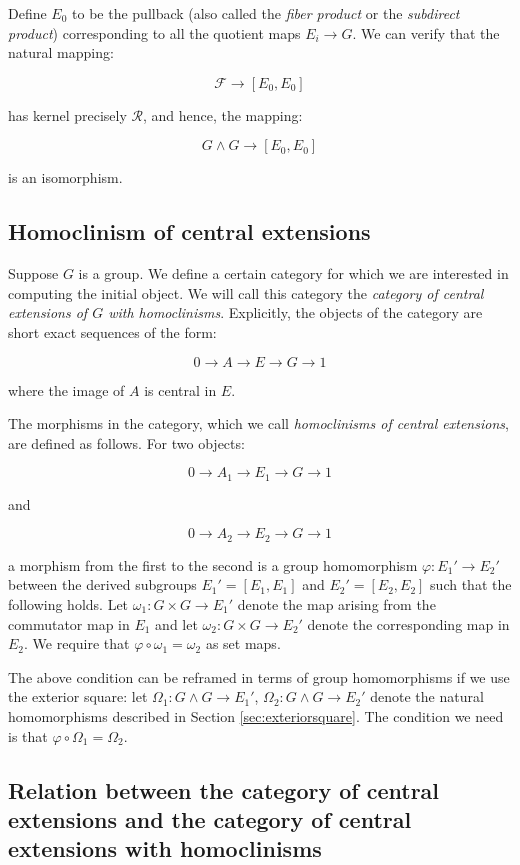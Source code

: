 Define $E_0$ to be the pullback (also called the {\em fiber product}
or the {\em subdirect product}) corresponding to all the quotient maps
$E_i \to G$. We can verify that the natural mapping:

$$\mathcal{F} \to [E_0,E_0]$$

has kernel precisely $\mathcal{R}$, and hence, the mapping:

$$G \wedge G \to [E_0,E_0]$$

is an isomorphism.

\subsection{Homoclinism of central extensions}\label{sec:homoclinism-central-extensions}

Suppose $G$ is a group. We define a certain category for which we are
interested in computing the initial object. We will call this category
the {\em category of central extensions of $G$ with homoclinisms}. Explicitly,
the objects of the category are short exact sequences of the form:

$$0 \to A \to E \to G \to 1$$

where the image of $A$ is central in $E$.

The morphisms in the category, which we call {\em homoclinisms of
  central extensions}, are defined as follows. For two objects:

$$0 \to A_1 \to E_1 \to G \to 1$$

and

$$0 \to A_2 \to E_2 \to G \to 1$$

a morphism from the first to the second is a group homomorphism
$\varphi: E_1' \to E_2'$ between the derived subgroups $E_1' =
[E_1,E_1]$ and $E_2' = [E_2,E_2]$ such that the following holds. Let
$\omega_1: G \times G \to E_1'$ denote the map arising from the
commutator map in $E_1$ and let $\omega_2: G \times G \to E_2'$ denote
the corresponding map in $E_2$. We require that $\varphi \circ
\omega_1 = \omega_2$ as set maps.

The above condition can be reframed in terms of group homomorphisms if
we use the exterior square: let $\Omega_1: G \wedge G \to E_1'$,
$\Omega_2: G \wedge G \to E_2'$ denote the natural homomorphisms
described in Section \ref{sec:exteriorsquare}. The condition we need
is that $\varphi \circ \Omega_1 = \Omega_2$.

\subsection{Relation between the category of central extensions and the category of central extensions with homoclinisms}

